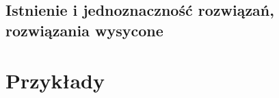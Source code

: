     \section{Istnienie i jednoznaczność rozwiązań, rozwiązania wysycone}
      
  
  \chapter{Przykłady}















